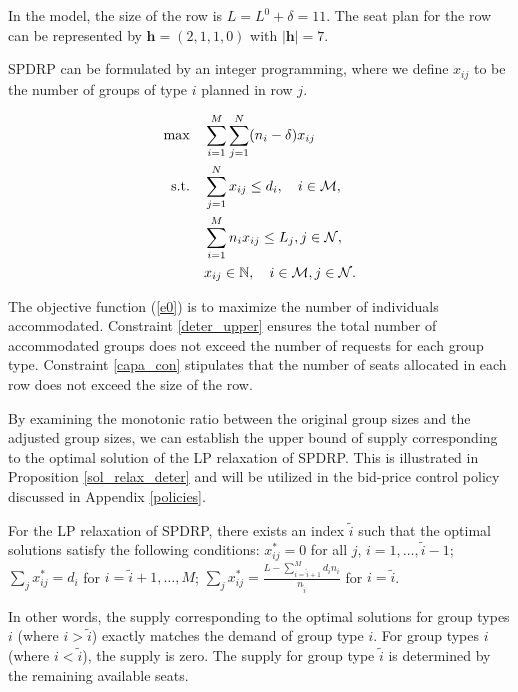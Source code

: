 In the model, the size of the row is $L = L^{0} + \delta =11$. The seat plan for the row can be represented by $\bm{h} = (2,1,1,0)$ with $|\bm{h}| = 7$.

SPDRP can be formulated by an integer programming, where we define $x_{ij}$ to be the number of groups of type $i$ planned in row $j$. 

\begin{align}
\max \quad & \sum_{i=1}^{M}  \sum_{j= 1}^{N} (n_i- \delta) x_{ij} \label{e0} \\
\text {s.t.} \quad & \sum_{j= 1}^{N} x_{ij} \leq d_{i}, \quad i \in \mathcal{M}, \label{deter_upper}\\ 
& \sum_{i=1}^{M} n_{i} x_{ij} \leq L_j, j \in \mathcal{N}, \label{capa_con} \\
& x_{ij} \in \mathbb{N}, \quad i \in \mathcal{M}, j \in \mathcal{N}. \notag 
\end{align}

The objective function (\ref{e0}) is to maximize the number of individuals accommodated. Constraint \eqref{deter_upper} ensures the total number of accommodated groups does not exceed the number of requests for each group type. Constraint \eqref{capa_con} stipulates that the number of seats allocated in each row does not exceed the size of the row.

By examining the monotonic ratio between the original group sizes and the adjusted group sizes, we can establish the upper bound of supply corresponding to the optimal solution of the LP relaxation of SPDRP. This is illustrated in Proposition \ref{sol_relax_deter} and will be utilized in the bid-price control policy discussed in Appendix \ref{policies}.

\begin{prop}\label{sol_relax_deter}
For the LP relaxation of \textup{SPDRP}, there exists an index $\tilde{i}$ such that the optimal solutions satisfy the following conditions: $x_{ij}^{*} = 0$ for all $j$, $i = 1,\ldots, \tilde{i}-1$; $\sum_{j} x_{ij}^{*} = d_{i}$ for $i = \tilde{i}+1,\ldots, M$; $\sum_{j} x_{ij}^{*} = \frac{L - \sum_{i = \tilde{i}+1}^{M} {d_i n_i}}{n_{\tilde{i}}}$ for $i = \tilde{i}$.
\end{prop}

In other words, the supply corresponding to the optimal solutions for group types $i$ (where $i > \tilde{i}$) exactly matches the demand of group type $i$. For group types $i$ (where $i < \tilde{i}$), the supply is zero. The supply for group type $\tilde{i}$ is determined by the remaining available seats.

